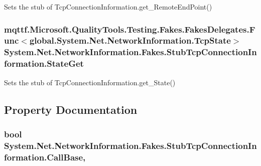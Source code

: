 Sets the stub of Tcp\-Connection\-Information.\-get\-\_\-\-Remote\-End\-Point()

\hypertarget{class_system_1_1_net_1_1_network_information_1_1_fakes_1_1_stub_tcp_connection_information_af19a59ebf73bf81528dd07388724eb22}{
\subsubsection[{State\-Get}]{\setlength{\rightskip}{0pt plus 5cm}mqttf.\-Microsoft.\-Quality\-Tools.\-Testing.\-Fakes.\-Fakes\-Delegates.\-Func$<$global.\-System.\-Net.\-Network\-Information.\-Tcp\-State$>$ System.\-Net.\-Network\-Information.\-Fakes.\-Stub\-Tcp\-Connection\-Information.\-State\-Get}}\label{class_system_1_1_net_1_1_network_information_1_1_fakes_1_1_stub_tcp_connection_information_af19a59ebf73bf81528dd07388724eb22}


Sets the stub of Tcp\-Connection\-Information.\-get\-\_\-\-State()



\subsection{Property Documentation}
\hypertarget{class_system_1_1_net_1_1_network_information_1_1_fakes_1_1_stub_tcp_connection_information_ae30d6d077dffd759d48248aa33d0361b}{
\subsubsection[{Call\-Base}]{\setlength{\rightskip}{0pt plus 5cm}bool System.\-Net.\-Network\-Information.\-Fakes.\-Stub\-Tcp\-Connection\-Information.\-Call\-Base\hspace{0.3cm}{\ttfamily [get]}, {\ttfamily [set]}}}\label{class_system_1_1_net_1_1_network_information_1_1_fakes_1_1_stub_tcp_connection_information_ae30d6d077dffd759d48248aa33d0361b}


